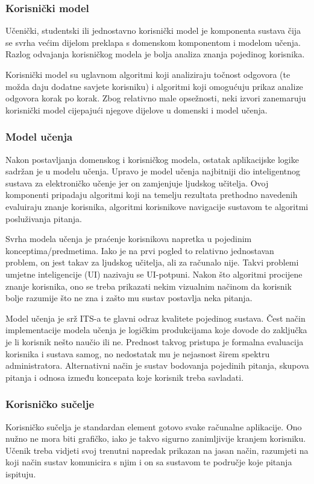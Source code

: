 \documentclass[times, utf8, zavrsni]{fer}
\begin{document}
\subsubsection{Korisnički model}
Učenički, studentski ili jednostavno korisnički model je komponenta sustava čija se svrha većim dijelom preklapa s domenskom komponentom i modelom učenja. Razlog odvajanja korisničkog modela je bolja analiza znanja pojedinog korisnika. 
\par
Korisnički model su uglavnom algoritmi koji analiziraju točnost odgovora (te možda daju dodatne savjete korisniku) i algoritmi koji omogućuju prikaz analize odgovora korak po korak. Zbog relativno male opsežnosti, neki izvori zanemaruju korisnički model cijepajući njegove dijelove u domenski i model učenja.

\subsubsection{Model učenja}
Nakon postavljanja domenskog i korisničkog modela, ostatak aplikacijske logike sadržan je u modelu učenja. Upravo je model učenja najbitniji dio inteligentnog sustava za elektroničko učenje jer on zamjenjuje ljudskog učitelja. Ovoj komponenti pripadaju algoritmi koji na temelju rezultata prethodno navedenih evaluiraju znanje korisnika, algoritmi korisnikove navigacije sustavom te algoritmi posluživanja pitanja.
\par
Svrha modela učenja je praćenje korisnikova napretka u pojedinim konceptima/predmetima. Iako je na prvi pogled to relativno jednostavan problem, on jest takav za ljudskog učitelja, ali za računalo nije. Takvi problemi umjetne inteligencije (UI) nazivaju se UI-potpuni. Nakon što algoritmi procijene znanje korisnika, ono se treba prikazati nekim vizualnim načinom da korisnik bolje razumije što ne zna i zašto mu sustav postavlja neka pitanja.
\par
Model učenja je srž ITS-a te glavni odraz kvalitete pojedinog sustava. Čest način implementacije modela učenja je logičkim produkcijama koje dovode do zaključka je li korisnik nešto naučio ili ne. Prednost takvog pristupa je formalna evaluacija korisnika i sustava samog, no nedostatak mu je nejasnost širem spektru administratora. Alternativni način je sustav bodovanja pojedinih pitanja, skupova pitanja i odnosa između koncepata koje korisnik treba savladati.

\subsubsection{Korisničko sučelje}
Korisničko sučelja je standardan element gotovo svake računalne aplikacije. Ono nužno ne mora biti grafičko, iako je takvo sigurno zanimljivije kranjem korisniku. Učenik treba vidjeti svoj trenutni napredak prikazan na jasan način, razumjeti na koji način sustav komunicira s njim i on sa sustavom te područje koje pitanja ispituju.
\end{document}
